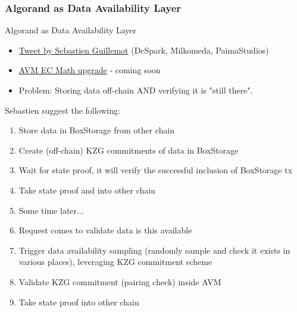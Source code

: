 \documentclass[aspectratio=169,xcolor=dvipsnames]{beamer}
\begin{document}
\subsubsection{Algorand as Data Availability Layer}
\begin{frame}{Algorand as Data Availability Layer}
\begin{itemize}
    \item \href{https://twitter.com/SebastienGllmt/status/1619451660102938627?s=20}{Tweet by Sebastien Guillemot} (DcSpark, Milkomeda, PaimaStudios) 
    \item \href{https://github.com/algorand/go-algorand/pull/4924}{AVM EC Math upgrade} - coming soon
    \item Problem: Storing data off-chain AND verifying it is "still there".
\end{itemize}    
Sebastien suggest the following:
\begin{enumerate}
    \item Store data in BoxStorage from other chain
    \item Create (off-chain) KZG commitments of data in BoxStorage
    \item Wait for state proof, it will verify the successful inclusion of BoxStorage tx
    \item Take state proof and into other chain
    \item Some time later...
    \item Request comes to validate data is this available
    \item Trigger data availability sampling (randomly sample and check it exists in various places), leveraging KZG commitment scheme
    \item Validate KZG commitment (pairing check) inside AVM
    \item Take state proof into other chain
\end{enumerate}
\end{frame}
\end{document}
